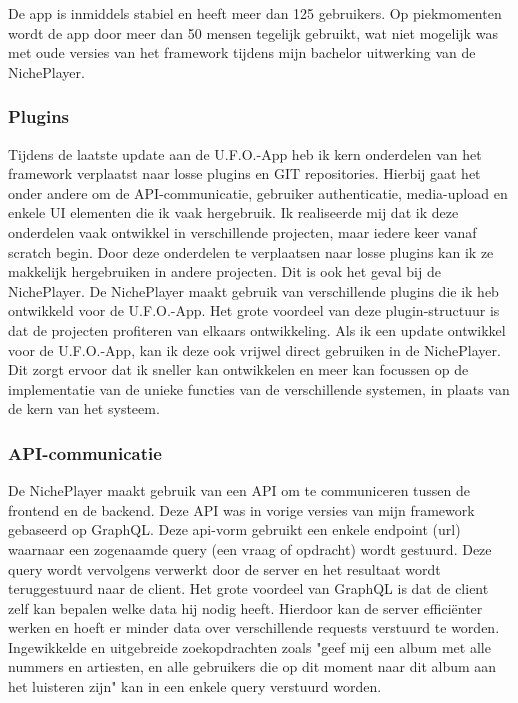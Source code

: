 De app is inmiddels stabiel en heeft meer dan 125 gebruikers. Op piekmomenten wordt de app door meer dan 50 mensen tegelijk gebruikt, wat niet mogelijk was met oude versies van het framework tijdens mijn bachelor uitwerking van de NichePlayer.

\subsubsection*{Plugins}
Tijdens de laatste update aan de U.F.O.-App heb ik kern onderdelen van het framework verplaatst naar losse plugins en GIT repositories. Hierbij gaat het onder andere om de API-communicatie, gebruiker authenticatie, media-upload en enkele UI elementen die ik vaak hergebruik. Ik realiseerde mij dat ik deze onderdelen vaak ontwikkel in verschillende projecten, maar iedere keer vanaf scratch begin. Door deze onderdelen te verplaatsen naar losse plugins kan ik ze makkelijk hergebruiken in andere projecten. Dit is ook het geval bij de NichePlayer. De NichePlayer maakt gebruik van verschillende plugins die ik heb ontwikkeld voor de U.F.O.-App. Het grote voordeel van deze plugin-structuur is dat de projecten profiteren van elkaars ontwikkeling. Als ik een update ontwikkel voor de U.F.O.-App, kan ik deze ook vrijwel direct gebruiken in de NichePlayer. Dit zorgt ervoor dat ik sneller kan ontwikkelen en meer kan focussen op de implementatie van de unieke functies van de verschillende systemen, in plaats van de kern van het systeem.

\subsubsection*{API-communicatie}
De NichePlayer maakt gebruik van een API om te communiceren tussen de frontend en de backend. Deze API was in vorige versies van mijn framework gebaseerd op GraphQL. Deze api-vorm gebruikt een enkele endpoint (url) waarnaar een zogenaamde query (een vraag of opdracht) wordt gestuurd. Deze query wordt vervolgens verwerkt door de server en het resultaat wordt teruggestuurd naar de client. Het grote voordeel van GraphQL is dat de client zelf kan bepalen welke data hij nodig heeft. Hierdoor kan de server efficiënter werken en hoeft er minder data over verschillende requests verstuurd te worden. Ingewikkelde en uitgebreide zoekopdrachten zoals "geef mij een album met alle nummers en artiesten, en alle gebruikers die op dit moment naar dit album aan het luisteren zijn" kan in een enkele query verstuurd worden.

